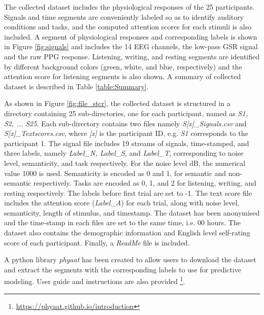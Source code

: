 \documentclass{article}
\begin{document}
The collected dataset includes the physiological responses of the 25 participants. Signals and time segments are conveniently labeled so as to identify auditory conditions and tasks, and the computed attention scores for each stimuli is also included. A segment of physiological responses and corresponding labels is shown in Figure \ref{fig:signals} and includes the 14 EEG channels, the low-pass GSR signal and the raw PPG response. Listening, writing, and resting segments are identified by different background colors (green, white, and blue, respectively) and the attention score for listening segments is also shown. A summary of collected dataset is described in Table \ref{table:Summary}. 

   

As shown in Figure \ref{fig:file_stcr}, the collected dataset is structured in a directory containing 25 sub-directories, one for each participant, named as \textit{S1, S2, ... S25}. Each sub-directory contains two files namely \textit{S[x]\_Signals.csv} and \textit{S[x]\_Textscores.csv}, where {\it [x]} is the participant ID, e.g. {\it S1} corresponds to the participant 1. The signal file includes 19 streams of signals, time-stamped, and three labels, namely \textit{Label\_N, Label\_S}, and \textit{Label\_T}, corresponding to noise level, semanticity, and task respectively. For the noise level  dB, the numerical value 1000 is used. Semanticity is encoded as 0 and 1, for semantic and non-semantic respectively. Tasks are encoded as 0, 1, and 2 for listening, writing, and resting respectively. The labels before first trial are set to -1. The text score file includes the attention score (\textit{Label\_A}) for each trial, along with noise level, semanticity, length of stimulus, and timestamp. The dataset has been anonymised and the time-stamp in each files are set to the same time, i.e. 00 hours. The dataset also contains the demographic information and English level self-rating score of each participant. Finally, a {\it ReadMe} file is included. 

A python library \textit{phyaat} has been created to allow users to download the dataset and extract the segments with the corresponding labels to use for predictive modeling. User guide and instructions are also provided \footnote{\url{https://phyaat.github.io/introduction}}.
\end{document}
